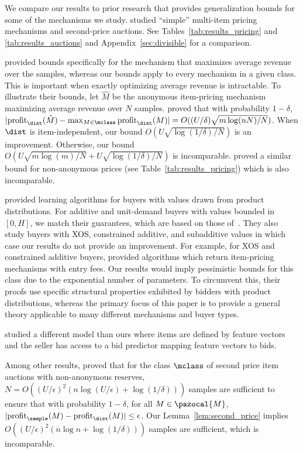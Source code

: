 We compare our results to prior research that provides generalization bounds for some of the mechanisms we study. 
\citet{Morgenstern16:Learning} studied ``simple'' multi-item pricing mechanisms and second-price auctions.
See Tables~\ref{tab:results_pricing} and \ref{tab:results_auctions} and Appendix~\ref{sec:divisible} for a comparison.

\citet{Syrgkanis17:Sample} provided bounds specifically for the mechanism that maximizes average revenue over the samples, whereas our bounds apply to every mechanism in a given class. This is important when exactly optimizing average revenue is intractable. To illustrate their bounds, let $\hat{M}$ be the anonymous item-pricing mechanism maximizing average revenue over  $N$ samples. \citet{Syrgkanis17:Sample} proved that with probability $1-\delta$, $|\profit_{\dist}(\hat{M}) - \max_{M \in \mclass}\profit_{\dist}(M)| = O((U/\delta)\sqrt{m\log(nN)/N})$. When $\dist$ is item-independent, our bound $O(U\sqrt{\log(1/\delta)/N})$ is an improvement. Otherwise, our bound $O(U \sqrt{m \log (m)/N} + U\sqrt{\log(1/\delta)/N})$ is incomparable. \citet{Syrgkanis17:Sample} proved a similar bound for non-anonymous prices (see Table~\ref{tab:results_pricing}) which is also incomparable.

\citet{Cai17:Learning} provided learning algorithms for buyers with values drawn from product distributions.
For additive and unit-demand buyers with values bounded in $[0,H]$, we match their guarantees, which are based on those of~\citet{Morgenstern16:Learning}. They also study buyers with XOS, constrained additive, and subadditive values in which case our results do not provide an improvement.
For example, for XOS and constrained additive buyers, \citet{Cai17:Learning} provided algorithms which return item-pricing mechanisms with entry fees. Our results would imply pessimistic bounds for this class due to the exponential number of parameters. To circumvent this, their proofs use specific structural properties exhibited by bidders with product distributions, whereas the primary focus of this paper is to provide a general theory applicable to many different mechanisms and buyer types.

\citet{Medina17:Revenue} studied a different model than ours where items are defined by feature vectors and the seller has access to a bid predictor mapping feature vectors to bids.

Among other results, \citet[][Section 6.1]{Devanur17:Sample} proved that for the class $\mclass$ of second price item auctions with non-anonymous reserves, $N = O((U/\epsilon)^2(n \log (U/\epsilon) + \log (1/\delta)))$ samples are sufficient to ensure that with probability $1-\delta$, for all $M \in \pazocal{M}$, $|\profit_{\sample}(M) - \profit_{\dist}(M)| \leq \epsilon$. Our Lemma~\ref{lem:second_price} implies $O((U/\epsilon)^2(n \log n + \log (1/\delta)))$ samples are sufficient, which is incomparable.

